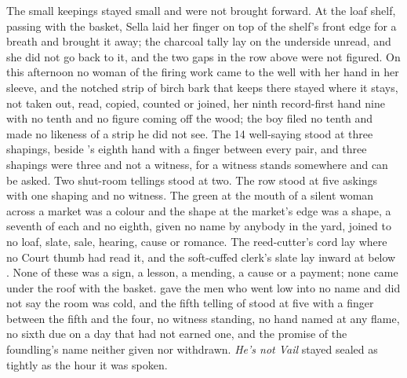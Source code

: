 The small keepings stayed small and were not brought forward. At the loaf shelf, passing with the basket, Sella laid her finger on top of the shelf's front edge for a breath and brought it away; the charcoal tally lay on the underside unread, and she did not go back to it, and the two gaps in the row above were not figured. On this afternoon no woman of the firing work came to the well with her hand in her sleeve, and the notched strip of birch bark that  keeps there stayed where it stays, not taken out, read, copied, counted or joined, her ninth record-first hand nine with no tenth and no figure coming off the wood; the boy filed no tenth and made no likeness of a strip he did not see. The  14 well-saying stood at three shapings, beside 's eighth hand with a finger between every pair, and three shapings were three and not a witness, for a witness stands somewhere and can be asked. Two shut-room tellings stood at two. The row stood at five askings with one shaping and no witness. The green at the mouth of a silent woman across a market was a colour and the shape at the market's edge was a shape, a seventh of each and no eighth, given no name by anybody in the yard, joined to no loaf, slate, sale, hearing, cause or romance. The reed-cutter's cord lay where no Court thumb had read it, and the soft-cuffed clerk's slate lay inward at  below . None of these was a sign, a lesson, a mending, a cause or a payment; none came under the roof with the basket.  gave the men who went low into  no name and did not say the room was cold, and the fifth telling of  stood at five with a finger between the fifth and the four, no witness standing, no hand named at any flame, no sixth due on a day that had not earned one, and the promise of the foundling's name neither given nor withdrawn. \emph{He's not Vail} stayed sealed as tightly as the hour it was spoken.

\scenebreak

